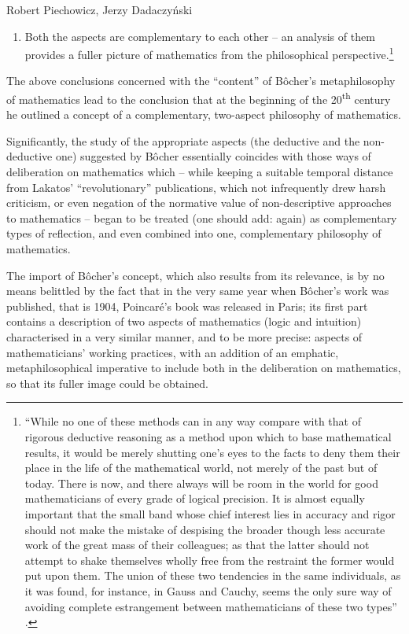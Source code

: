 \begin{artengenv}{Robert Piechowicz, Jerzy Dadaczyński}
\begin{enumerate}
{%
\parencite[][p.134]{bocher_fundamental_1904}.%
}
\item Both the aspects are complementary to each other -- an analysis of them provides a fuller picture of mathematics from the philosophical perspective.\footnote{``While no one of these methods can in any way compare with that of rigorous deductive reasoning as a method upon which to base mathematical results, it would be merely shutting one's eyes to the facts to deny them their place in the life of the mathematical world, not merely of the past but of today. There is now, and there always will be room in the world for good mathematicians of every grade of logical precision. It is almost equally important that the small band whose chief interest lies in accuracy and rigor should not make the mistake of despising the broader though less accurate work of the great mass of their colleagues; as that the latter should not attempt to shake themselves wholly free from the restraint the former would put upon them. The union of these two tendencies in the same individuals, as it was found, for instance, in Gauss and Cauchy, seems the only sure way of avoiding complete estrangement between mathematicians of these two types''
\parencite[][p.135]{bocher_fundamental_1904}.%
}
\end{enumerate}
The above conclusions concerned with the ``content'' of Bôcher's metaphilosophy of mathematics lead to the conclusion that at the beginning of the 20\textsuperscript{th} century he outlined a concept of a complementary, two-aspect philosophy of mathematics.

Significantly, the study of the appropriate aspects (the deductive and the non-deductive one) suggested by Bôcher essentially coincides with those ways of deliberation on mathematics which -- while keeping a suitable temporal distance from Lakatos' ``revolutionary'' publications, which not infrequently drew harsh criticism, or even negation of the normative value of non-descriptive approaches to mathematics -- began to be treated (one should add: again) as complementary types of reflection, and even combined into one, complementary philosophy of mathematics.

The import of Bôcher's concept, which also results from its relevance, is by no means belittled by the fact that in the very same year when Bôcher's work was published, that is 1904, Poincaré's book
\parencite[][]{poincare_valeur_1904}
 was released in Paris; its first part contains a description of two aspects of mathematics (logic and intuition) characterised in a very similar manner, and to be more precise: aspects of mathematicians' working practices, with an addition of an emphatic, metaphilosophical imperative to include both in the deliberation on mathematics, so that its fuller image could be obtained.


\end{artengenv}
